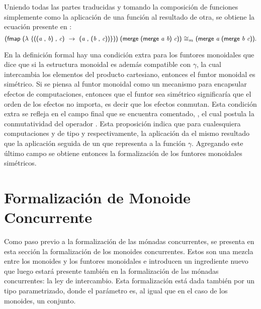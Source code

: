 Uniendo todas las partes traducidas y tomando la composición de funciones simplemente como la aplicación de una función al resultado de otra, se obtiene la ecuación presente en :
\begin{equation*}
\AgdaSymbol{(}\AgdaField{fmap} \ \AgdaSymbol{($\lambda \ \{$((}\AgdaBound{a} \ \AgdaInductiveConstructor{,} \ \AgdaBound{b}\AgdaSymbol{)} \ \AgdaInductiveConstructor{,} \ \AgdaBound{c}\AgdaSymbol{) \ $\rightarrow$ \ (}\AgdaBound{a} \ \AgdaInductiveConstructor{,} \ \AgdaSymbol{(}\AgdaBound{b} \ \AgdaInductiveConstructor{,} \ \AgdaBound{c}\AgdaSymbol{))\}))} \ \AgdaSymbol{(}\AgdaField{merge} \ \AgdaSymbol{(}\AgdaField{merge} \ \AgdaBound{a b}\AgdaSymbol{)} \  \AgdaBound{c}\AgdaSymbol{))} \ \AgdaField{$\cong_m$} \ \AgdaSymbol{(}\AgdaField{merge} \ \AgdaBound{a} \ \AgdaSymbol{(}\AgdaField{merge} \ \AgdaBound{b c}\AgdaSymbol{))}.
\end{equation*}

En la definición formal hay una condición extra para los funtores monoidales que dice que si la estructura monoidal es además compatible con $\gamma$, la cual intercambia los elementos del producto cartesiano, entonces el funtor monoidal es simétrico. Si se piensa al funtor monoidal como un mecanismo para encapsular efectos de computaciones, entonces que el funtor sea simétrico significaría que el orden de los efectos no importa, es decir que los efectos conmutan. Esta condición extra se refleja en el campo final que se encuentra comentado, , el cual postula la conmutatividad del operador . Esta proposición indica que para cualesquiera computaciones  y  de tipo  y  respectivamente, la aplicación   da el mismo resultado que la aplicación   seguida de un  que representa a la función $\gamma$. Agregando este último campo se obtiene entonces la formalización de los funtores monoidales simétricos.

\section{Formalización de Monoide Concurrente}\label{form:monoidconc}

Como paso previo a la formalización de las mónadas concurrentes, se presenta en esta sección la formalización de los monoides concurrentes. Estos son una mezcla entre los monoides y los funtores monoidales e introducen un ingrediente nuevo que luego estará presente también en la formalización de las mónadas concurrentes: la ley de intercambio. Esta formalización está dada también por un tipo  parametrizado, donde el parámetro es, al igual que en el caso de los monoides, un conjunto. 

